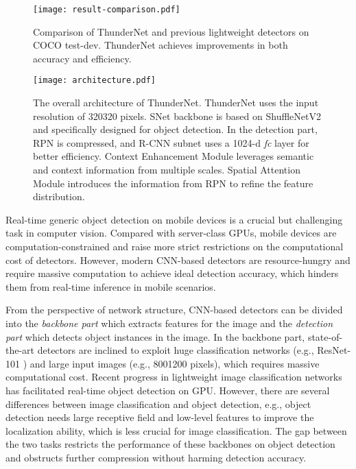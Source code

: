 \documentclass[10pt,twocolumn,letterpaper]{article}
\begin{document}
\begin{figure}[!t]
\centering
\texttt{[image: result-comparison.pdf]}
\caption{
Comparison of ThunderNet and previous lightweight detectors on COCO test-dev\protect\footnotemark[1].
ThunderNet achieves improvements in both accuracy and efficiency.
}
\label{figure:result-comparison}
\end{figure}

\begin{figure*}[!t]
\centering
\texttt{[image: architecture.pdf]}
\caption{
The overall architecture of ThunderNet.
ThunderNet uses the input resolution of 320320 pixels.
SNet backbone is based on ShuffleNetV2 and specifically designed for object detection.
In the detection part, RPN is compressed, and R-CNN subnet uses a 1024-d \emph{fc} layer for better efficiency.
Context Enhancement Module leverages semantic and context information from multiple scales.
Spatial Attention Module introduces the information from RPN to refine the feature distribution.
}
\label{figure:overall-architecture}
\end{figure*}

Real-time generic object detection on mobile devices is a crucial but challenging task in computer vision.
Compared with server-class GPUs, mobile devices are computation-constrained and raise more strict restrictions on the computational cost of detectors.
However, modern CNN-based detectors are resource-hungry and require massive computation to achieve ideal detection accuracy, which hinders them from real-time inference in mobile scenarios.








From the perspective of network structure, CNN-based detectors can be divided into the \emph{backbone part} which extracts features for the image and the \emph{detection part} which detects object instances in the image.
In the backbone part, state-of-the-art detectors are inclined to exploit huge classification networks (e.g., ResNet-101 \cite{he2016deep,dai2016r,lin2017feature,lin2017focal}) and large input images (e.g., 8001200 pixels), which requires massive computational cost.
Recent progress in lightweight image classification networks \cite{chollet2017xception,zhang2018shufflenet,ma2018shufflenet,howard2017mobilenets,sandler2018mobilenetv2} has facilitated real-time object detection \cite{howard2017mobilenets,sandler2018mobilenetv2,li2017light,ma2018shufflenet} on GPU.
However, there are several differences between image classification and object detection, e.g., object detection needs large receptive field and low-level features to improve the localization ability, which is less crucial for image classification.
The gap between the two tasks restricts the performance of these backbones on object detection and obstructs further compression without harming detection accuracy.
\end{document}
